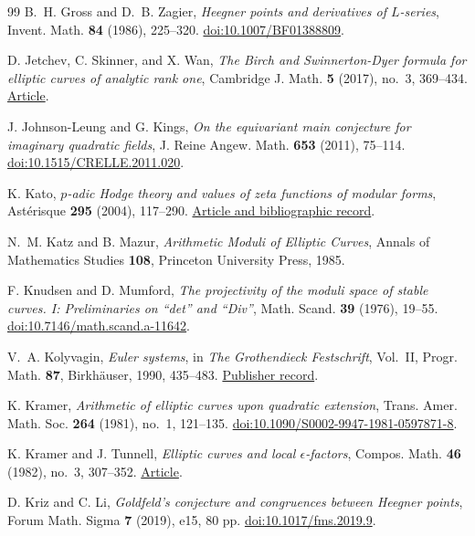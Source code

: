 \begin{thebibliography}{99}
B.~H. Gross and D.~B. Zagier,
\emph{Heegner points and derivatives of $L$-series},
Invent. Math. \textbf{84} (1986), 225--320.
\href{https://doi.org/10.1007/BF01388809}{doi:10.1007/BF01388809}.

D. Jetchev, C. Skinner, and X. Wan,
\emph{The Birch and Swinnerton-Dyer formula for elliptic curves of analytic rank one},
Cambridge J. Math. \textbf{5} (2017), no.~3, 369--434.
\href{https://archive.intlpress.com/site/pub/files/_fulltext/journals/cjm/2017/0005/0003/CJM-2017-0005-0003-a002.pdf}{Article}.

J. Johnson-Leung and G. Kings,
\emph{On the equivariant main conjecture for imaginary quadratic fields},
J. Reine Angew. Math. \textbf{653} (2011), 75--114.
\href{https://doi.org/10.1515/CRELLE.2011.020}{doi:10.1515/CRELLE.2011.020}.

K. Kato,
\emph{$p$-adic Hodge theory and values of zeta functions of modular forms},
Ast\'erisque \textbf{295} (2004), 117--290.
\href{https://www.numdam.org/item/AST_2004__295__117_0/}{Article and bibliographic record}.

N.~M. Katz and B. Mazur,
\emph{Arithmetic Moduli of Elliptic Curves},
Annals of Mathematics Studies \textbf{108}, Princeton University Press, 1985.

F. Knudsen and D. Mumford,
\emph{The projectivity of the moduli space of stable curves. I: Preliminaries on ``det'' and ``Div''},
Math. Scand. \textbf{39} (1976), 19--55.
\href{https://doi.org/10.7146/math.scand.a-11642}{doi:10.7146/math.scand.a-11642}.

V.~A. Kolyvagin,
\emph{Euler systems},
in \emph{The Grothendieck Festschrift}, Vol.~II,
Progr. Math. \textbf{87}, Birkh\"auser, 1990, 435--483.
\href{https://link.springer.com/book/10.1007/978-0-8176-4575-5}{Publisher record}.

K. Kramer,
\emph{Arithmetic of elliptic curves upon quadratic extension},
Trans. Amer. Math. Soc. \textbf{264} (1981), no.~1, 121--135.
\href{https://doi.org/10.1090/S0002-9947-1981-0597871-8}{doi:10.1090/S0002-9947-1981-0597871-8}.

K. Kramer and J. Tunnell,
\emph{Elliptic curves and local $\epsilon$-factors},
Compos. Math. \textbf{46} (1982), no.~3, 307--352.
\href{https://www.numdam.org/item/CM_1982__46_3_307_0/}{Article}.

D. Kriz and C. Li,
\emph{Goldfeld's conjecture and congruences between Heegner points},
Forum Math. Sigma \textbf{7} (2019), e15, 80 pp.
\href{https://doi.org/10.1017/fms.2019.9}{doi:10.1017/fms.2019.9}.


\end{thebibliography}
